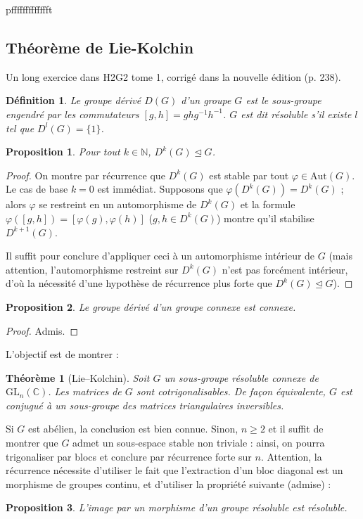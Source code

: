 \documentclass[a4paper, 11pt]{article}
\def\N{\mathbb{N}}
\def\C{\mathbb{C}}
\def\GL{\mathrm{GL}}
\def\Aut{\mathrm{Aut}}
\newtheorem*{definition}{Définition}
\newtheorem*{proposition}{Proposition}
\newtheorem*{theorem}{Théorème}
\begin{document}
pffffffffffffft

\newpage

\subsection{Théorème de Lie-Kolchin}

Un long exercice dans H2G2 tome 1, corrigé dans la nouvelle édition (p. 238).

\begin{definition}
  Le \emph{groupe dérivé} $D(G)$ d'un groupe $G$ est le sous-groupe engendré par
  les commutateurs $[g,h]= ghg^{-1}h^{-1}$. $G$ est dit \emph{résoluble} s'il
  existe $l$ tel que $D^l(G) = \{1\}$.
\end{definition}
\begin{proposition}
  Pour tout $k \in \N$, $D^k(G) \trianglelefteq G$.
\end{proposition}
\begin{proof}
  On montre par récurrence que $D^k(G)$ est stable par tout $\varphi \in
  \Aut(G)$. Le cas de base $k=0$ est immédiat. Supposons que $\varphi(D^k(G)) =
  D^k(G)$ ; alors $\varphi$ se restreint en un automorphisme de $D^k(G)$ et la
  formule $\varphi([g,h]) = [\varphi(g),\varphi(h)]$ ($g,h \in D^k(G)$) montre
  qu'il stabilise $D^{k+1}(G)$.

  Il suffit pour conclure d'appliquer ceci à un automorphisme intérieur de $G$
  (mais attention, l'automorphisme restreint sur $D^k(G)$ n'est pas forcément
  intérieur, d'où la nécessité d'une hypothèse de récurrence plus forte que
  $D^k(G) \trianglelefteq G$).
\end{proof}

\begin{proposition}
  Le groupe dérivé d'un groupe connexe est connexe.
\end{proposition}
\begin{proof}
  Admis.
\end{proof}

L'objectif est de montrer :

\begin{theorem}[Lie--Kolchin]
  Soit $G$ un sous-groupe résoluble connexe de $\GL_n(\C)$. Les matrices de $G$
  sont cotrigonalisables. De façon équivalente, $G$ est conjugué à un
  sous-groupe des matrices triangulaires inversibles.
\end{theorem}

Si $G$ est abélien, la conclusion est bien connue. Sinon, $n \geq 2$ et il
suffit de montrer que $G$ admet un sous-espace stable non triviale : ainsi, on
pourra trigonaliser par blocs et conclure par récurrence forte sur $n$.
Attention, la récurrence nécessite d'utiliser le fait que l'extraction d'un bloc
diagonal est un morphisme de groupes continu, et d'utiliser la propriété
suivante (admise) :
\begin{proposition}
  L'image par un morphisme d'un groupe résoluble est résoluble.
\end{proposition}
\end{document}
